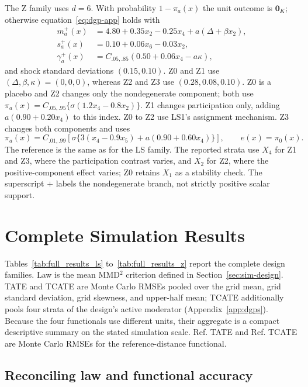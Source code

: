 The Z family uses $d=6$. With probability $1-\pi_a(x)$ the unit outcome is $\mathbf0_K$; otherwise equation~\eqref{eq:dgp-app} holds with
\begin{align*}
 m_a^+(x)&=4.80+0.35x_2-0.25x_4+a(\Delta+\beta x_2),\\
 s_a^+(x)&=0.10+0.06x_6-0.03x_2,\\
 \gamma_a^+(x)&=C_{.05,.85}(0.50+0.06x_4-a\kappa),
\end{align*}
and shock standard deviations $(0.15,0.10)$. Z0 and Z1 use $(\Delta,\beta,\kappa)=(0,0,0)$, whereas Z2 and Z3 use $(0.28,0.08,0.10)$. Z0 is a placebo and Z2 changes only the nondegenerate component; both use $\pi_a(x)=C_{.05,.95}\{\sigma(1.2x_4-0.8x_2)\}$. Z1 changes participation only, adding $a(0.90+0.20x_4)$ to this index. Z0 to Z2 use LS1's assignment mechanism. Z3 changes both components and uses
\[
 \pi_a(x)=C_{.01,.99}[\sigma\{3(x_4-0.9x_5)+a(0.90+0.60x_4)\}],
 \qquad e(x)=\pi_0(x).
\]
The reference is the same as for the LS family. The reported strata use $X_4$ for Z1 and Z3, where the participation contrast varies, and $X_2$ for Z2, where the positive-component effect varies; Z0 retains $X_1$ as a stability check. The superscript $+$ labels the nondegenerate branch, not strictly positive scalar support.

\section{Complete Simulation Results}\label{app:simulation-results}

Tables~\ref{tab:full_results_ls} to~\ref{tab:full_results_z} report the complete design families. Law is the mean MMD$^2$ criterion defined in Section~\ref{sec:sim-design}. TATE and TCATE are Monte Carlo RMSEs pooled over the grid mean, grid standard deviation, grid skewness, and upper-half mean; TCATE additionally pools four strata of the design's active moderator (Appendix~\ref{app:dgps}). Because the four functionals use different units, their aggregate is a compact descriptive summary on the stated simulation scale. Ref. TATE and Ref. TCATE are Monte Carlo RMSEs for the reference-distance functional.





\subsection{Reconciling law and functional accuracy}

